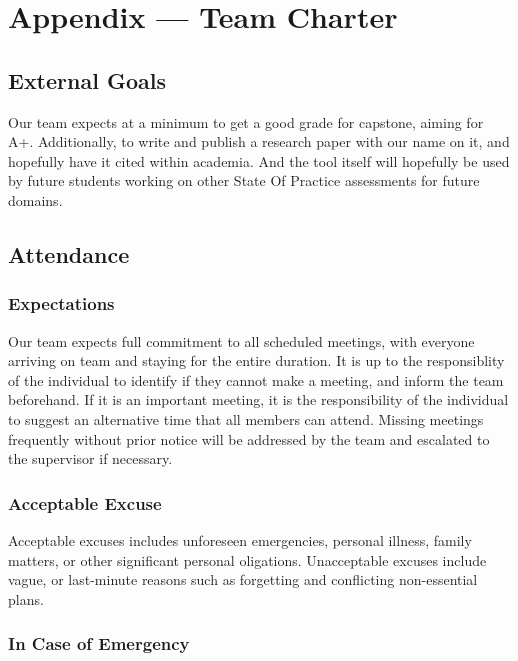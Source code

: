 \documentclass{article}
\begin{document}
\newpage{}

\section*{Appendix --- Team Charter}

\subsection*{External Goals}

Our team expects at a minimum to get a good grade for capstone, aiming for A+. Additionally, to write and publish a research paper with our name on it, and hopefully have it cited within academia.
And the tool itself will hopefully be used by future students working on other State Of Practice assessments for future domains.

\subsection*{Attendance}

\subsubsection*{Expectations}

Our team expects full commitment to all scheduled meetings, with everyone arriving on team and staying for the entire duration. It is up to the responsiblity of the individual to identify if they cannot make a meeting, and inform the team beforehand.
If it is an important meeting, it is the responsibility of the individual to suggest an alternative time that all members can attend. Missing meetings frequently without prior notice will be addressed by the team and escalated to the supervisor if necessary.

\subsubsection*{Acceptable Excuse}

Acceptable excuses includes unforeseen emergencies, personal illness, family matters, or other significant personal oligations. Unacceptable excuses include vague, or last-minute reasons such as forgetting and conflicting non-essential plans.

\subsubsection*{In Case of Emergency}
\end{document}
